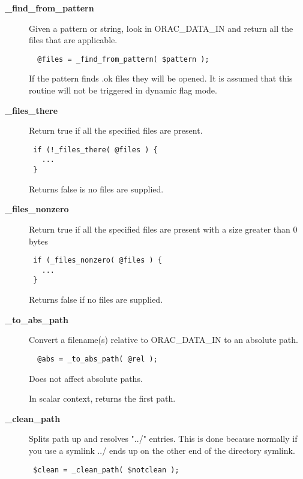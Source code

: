 \begin{description}
\begin{description}
\begin{description}
\item[{\textbf{\_find\_from\_pattern}}] \mbox{}

Given a pattern or string, look in ORAC\_DATA\_IN and return all the files
that are applicable.

\begin{verbatim}
  @files = _find_from_pattern( $pattern );
\end{verbatim}


If the pattern finds .ok files they will be opened. It is assumed that this
routine will not be triggered in dynamic flag mode.


\item[{\textbf{\_files\_there}}] \mbox{}

Return true if all the specified files are present.

\begin{verbatim}
 if (!_files_there( @files ) {
   ...
 }
\end{verbatim}


Returns false is no files are supplied.


\item[{\textbf{\_files\_nonzero}}] \mbox{}

Return true if all the specified files are present with
a size greater than 0 bytes

\begin{verbatim}
 if (_files_nonzero( @files ) {
   ...
 }
\end{verbatim}


Returns false if no files are supplied.


\item[{\textbf{\_to\_abs\_path}}] \mbox{}

Convert a filename(s) relative to ORAC\_DATA\_IN to an absolute path.

\begin{verbatim}
  @abs = _to_abs_path( @rel );
\end{verbatim}


Does not affect absolute paths.



In scalar context, returns the first path.


\item[{\textbf{\_clean\_path}}] \mbox{}

Splits path up and resolves "../" entries. This is done because normally if you
use a symlink ../ ends up on the other end of the directory symlink.

\begin{verbatim}
 $clean = _clean_path( $notclean );
\end{verbatim}



\end{description}
\end{description}
\end{description}
